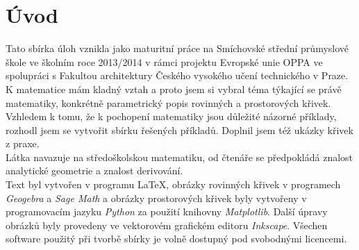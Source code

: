 \chapter{Úvod}
Tato sbírka úloh vznikla jako maturitní práce na Smíchovské střední průmyslové škole ve školním roce 2013/2014
v rámci projektu Evropské unie OPPA ve spolupráci s Fakultou architektury Českého vysokého učení technického v Praze.	\\[10pt]
K matematice mám kladný vztah a proto jsem si vybral téma týkající se právě matematiky, konkrétně parametrický popis rovinných a prostorových křivek. Vzhledem k tomu, že k pochopení matematiky jsou důležité názorné příklady, rozhodl jsem se vytvořit sbírku řešených příkladů. Doplnil jsem též ukázky křivek z praxe. \\
Látka navazuje na středoškolskou matematiku, od čtenáře se předpokládá znalost analytické geometrie a znalost derivování. \\[10pt]
Text byl vytvořen v programu \LaTeX{}, obrázky rovinných křivek v programech \textit{Geogebra} a \textit{Sage Math}
a obrázky prostorových křivek byly vytvořeny v programovacím jazyku \textit{Python} za použití knihovny \textit{Matplotlib}. Další úpravy
obrázků byly provedeny ve vektorovém grafickém editoru \textit{Inkscape}. Všechen software použitý při tvorbě sbírky je volně
dostupný pod svobodnými licencemi. \\[10pt]